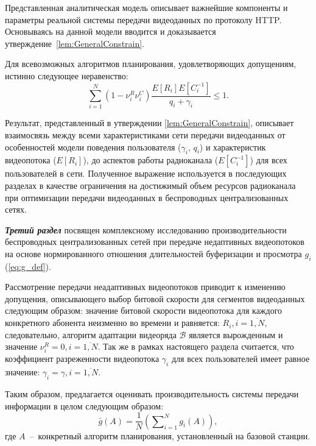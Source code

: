 Представленная аналитическая модель описывает важнейшие компоненты и параметры реальной системы передачи видеоданных по протоколу HTTP. Основываясь на данной модели вводится и доказывается утверждение~\ref{lem:GeneralConstrain}.

\begin{lemma}
\label{lem:GeneralConstrain}
Для всевозможных алгоритмов планирования, удовлетворяющих допущениям, истинно следующее неравенство:
\emph{
\begin{equation}
	\label{eq:GeneralConstrain}
	\nonumber
	\sum\limits_{i=1}^{N} {\left(1-\nu^R_i\nu^C_i\right)\frac{E[R_i]E[C_i^{-1}]}{q_i + \gamma_i}} \leq 1.
\end{equation}
}
\end{lemma}

Результат, представленный в утверждении \ref{lem:GeneralConstrain}, описывает взаимосвязь между всеми характеристиками сети передачи видеоданных от особенностей модели поведения пользователя ($\gamma_i$, $q_i$) и характеристик видеопотока ($E[R_i]$), до аспектов работы радиоканала ($E[C_i^{-1}]$) для всех пользователей в сети. Полученное выражение используется в последующих разделах в качестве ограничения на достижимый объем ресурсов радиоканала при оптимизации передачи видеоданных в беспроводных централизованных сетях.

\textbf{\textit{Третий раздел}} посвящен комплексному исследованию производительности беспроводных централизованных сетей при передаче недаптивных видеопотоков на основе нормированного отношения длительностей буферизации и просмотра $g_i$ (\ref{eq:g_def}).

Рассмотрение передачи неадаптивных видеопотоков приводит к изменению допущения, описывающего выбор битовой скорости для сегментов видеоданных следующим образом: значение битовой скорости видеопотока для каждого конкретного абонента неизменно во времени и равняется: $R_i, i=\overline{1,N}$, следовательно, алгоритм адаптации видеоряда $\mathcal{B}$ является вырожденным и значение $\nu^R_i = 0, i = \overline{1,N}$. Так же в рамках настоящего раздела считается, что коэффициент разреженности видеопотока $\gamma_i$ для всех пользователей имеет равное значение: $\gamma_i = \gamma, i=\overline{1,N}$.

Таким образом, предлагается оценивать производительность системы передачи информации в целом следующим образом:
$$\bar{g}\left(A\right) = \frac{1}{N}\left(\sum\nolimits_{i=1}^{N} {g_i\left(A\right)}\right),$$
где $A$~--~конкретный алгоритм планирования, установленный на базовой станции.

